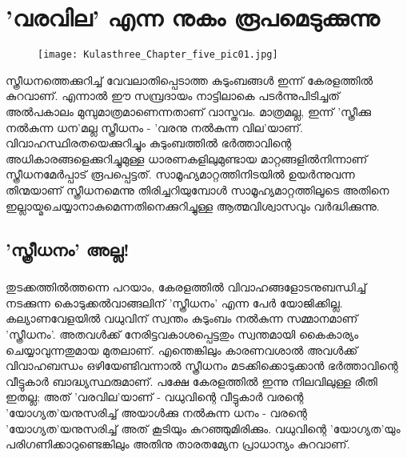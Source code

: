\chapter{'വരവില' എന്ന നുകം രൂപമെടുക്കുന്നു}
\label{chapter5}

\begin{figure}[h]
\begin{center}
\texttt{[image: Kulasthree\_Chapter\_five\_pic01.jpg]}
\end{center}
\end{figure}

സ്ത്രീധനത്തെക്കുറിച്ച് വേവലാതിപ്പെടാത്ത കുടുംബങ്ങൾ ഇന്ന് കേരളത്തിൽ കുറവാണ്. എന്നാൽ ഈ സമ്പ്രദായം നാട്ടിലാകെ പടർന്നുപിടിച്ചത് അൽപകാലം മുമ്പുമാത്രമാണെന്നതാണ് വാസ്തവം. മാത്രമല്ല, ഇന്ന് 'സ്ത്രീക്കു നൽകുന്ന ധന'മല്ല സ്ത്രീധനം - 'വരനു നൽകുന്ന വില'യാണ്. വിവാഹസ്ഥിരതയെക്കുറിച്ചും കുടുംബത്തിൽ ഭർത്താവിന്റെ അധികാരങ്ങളെക്കുറിച്ചുമുള്ള ധാരണകളിലുമുണ്ടായ മാറ്റങ്ങളിൽനിന്നാണ് സ്ത്രീധനമേർപ്പാട് രൂപപ്പെട്ടത്. സാമൂഹ്യമാറ്റത്തിനിടയിൽ ഉയർന്നുവന്ന തിന്മയാണ് സ്ത്രീധനമെന്നു തിരിച്ചറിയുമ്പോൾ സാമൂഹ്യമാറ്റത്തിലൂടെ അതിനെ ഇല്ലായ്മചെയ്യാനാകുമെന്നതിനെക്കുറിച്ചുള്ള ആത്മവിശ്വാസവും വർദ്ധിക്കുന്നു.

\section{'സ്ത്രീധനം' അല്ല!}
\label{ch5sec1}

\paragraph{}തുടക്കത്തിൽത്തന്നെ പറയാം, കേരളത്തിൽ വിവാഹങ്ങളോടനുബന്ധിച്ച് നടക്കുന്ന കൊടുക്കൽവാങ്ങലിന് 'സ്ത്രീധനം' എന്ന പേർ യോജിക്കില്ല. കല്യാണവേളയിൽ വധുവിന് സ്വന്തം കുടുംബം നൽകുന്ന സമ്മാനമാണ് 'സ്ത്രീധനം'. അതവൾക്ക് നേരിട്ടവകാശപ്പെട്ടതും സ്വന്തമായി കൈകാര്യം ചെയ്യാവുന്നതുമായ മുതലാണ്. എന്തെങ്കിലും കാരണവശാൽ അവൾക്ക് വിവാഹബന്ധം ഒഴിയേണ്ടിവന്നാൽ സ്ത്രീധനം മടക്കിക്കൊടുക്കാൻ ഭർത്താവിന്റെ വീട്ടുകാർ ബാദ്ധ്യസ്ഥരുമാണ്. പക്ഷേ കേരളത്തിൽ ഇന്നു നിലവിലുള്ള രീതി ഇതല്ല; അത് 'വരവില'യാണ് - വധുവിന്റെ വീട്ടുകാർ വരന്റെ 'യോഗ്യത'യനുസരിച്ച് അയാൾക്കു നൽകുന്ന ധനം - വരന്റെ 'യോഗ്യത'യനുസരിച്ച് അത് കൂടിയും കുറഞ്ഞുമിരിക്കും. വധുവിന്റെ 'യോഗ്യത'യും പരിഗണിക്കാറുണ്ടെങ്കിലും അതിനു താരതമ്യേന പ്രാധാന്യം കുറവാണ്.

